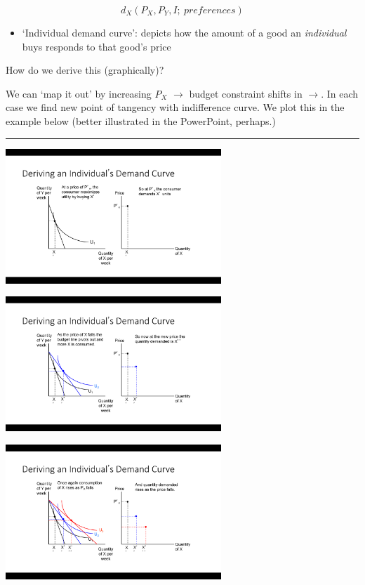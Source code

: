\documentclass[]{article}
\providecommand{\tightlist}{%
  \setlength{\itemsep}{0pt}\setlength{\parskip}{0pt}}
\begin{document}
\bigskip

\[d_X(P_X,P_Y,I; \: preferences)\]

\bigskip

\begin{itemize}
\tightlist
\item
  `Individual demand curve': depicts how the amount of a good an
  \emph{individual} buys responds to that good's price
\end{itemize}

How do we derive this (graphically)?

We can `map it out' by increasing \(P_X\) \(\rightarrow\) budget
constraint shifts in \(\rightarrow\). In each case we find new point of
tangency with indifference curve. We plot this in the example below
(better illustrated in the PowerPoint, perhaps.)

\begin{center}\rule{0.5\linewidth}{\linethickness}\end{center}

\includegraphics[height=2in]{picsfigs/dmd1.png}

\includegraphics[height=2in]{picsfigs/dmd2.png}

\includegraphics[height=2in]{picsfigs/dmd3.png}
\end{document}
